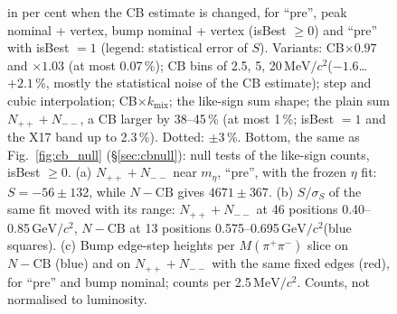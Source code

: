 \documentclass[11pt,a4paper]{article}
\newcommand{\Mpipi}{\ensuremath{M(\pi^{+}\pi^{-})}\xspace}
\newcommand{\GeVcc}{\ensuremath{\mathrm{GeV}/c^{2}}\xspace}
\newcommand{\MeVcc}{\ensuremath{\mathrm{MeV}/c^{2}}\xspace}
\begin{document}
\begin{figure}[!tbp]
{in per cent when the CB estimate is changed, for ``pre'', peak nominal + vertex, bump nominal + vertex (isBest $\ge0$) and ``pre'' with
isBest $=1$ (legend: statistical error of $S$). Variants: CB$\times0.97$ and $\times1.03$ (at most 0.07\,\%); CB bins of 2.5, 5,
20\,\MeVcc ($-1.6$\dots$+2.1$\,\%, mostly the statistical noise of the CB estimate); step and cubic interpolation; CB$\times
k_{\mathrm{mix}}$; the like-sign sum shape; the plain sum $N_{++}+N_{--}$, a CB larger by 38--45\,\% (at most 1\,\%; isBest $=1$ and the
X17 band up to 2.3\,\%). Dotted: $\pm3$\,\%. Bottom, the same as Fig.~\ref{fig:cb_null} (\S\ref{sec:cbnull}): null tests of the
like-sign counts, isBest $\ge0$. (a) $N_{++}+N_{--}$ near $m_\eta$, ``pre'', with the frozen $\eta$ fit: $S=-56\pm132$, while $N-\mathrm{CB}$ gives
$4671\pm367$. (b) $S/\sigma_S$ of the same fit moved with its range: $N_{++}+N_{--}$ at 46 positions 0.40--0.85\,\GeVcc, $N-\mathrm{CB}$ at 13
positions 0.575--0.695\,\GeVcc (blue squares). (c) Bump edge-step heights per \Mpipi slice on $N-\mathrm{CB}$ (blue) and on $N_{++}+N_{--}$
with the same fixed edges (red), for ``pre'' and bump nominal; counts per 2.5\,\MeVcc. Counts, not normalised to luminosity.}
\label{fig:res-cb}
\end{figure}
\end{document}
